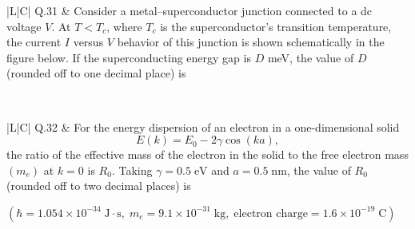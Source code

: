 \documentclass[12pt,a4paper]{article}
\begin{document}
\begin{table}[h!]
\begin{tabular}{|L|C|}
\hline
Q.31 &
Consider a metal--superconductor junction connected to a dc voltage $V$. At $T < T_c$,
where $T_c$ is the superconductor's transition temperature, the current $I$ versus $V$
behavior of this junction is shown schematically in the figure below. If the
superconducting energy gap is $D$ meV, the value of $D$ (rounded off to one decimal
place) is \underline{\hspace{1.5cm}}

\vspace{0.4cm}

\begin{center}
\end{center}
\\
\hline
\end{tabular}
\end{table}

\vspace{0.4cm}

\begin{table}[h!]
\begin{tabular}{|L|C|}
\hline
Q.32 &
For the energy dispersion of an electron in a one-dimensional solid
\[
  E(k) = E_0 - 2\gamma\cos(ka),
\]
the ratio of the effective mass of the electron in the solid to the free electron mass
$(m_e)$ at $k = 0$ is $R_0$. Taking $\gamma = 0.5\;\text{eV}$ and $a = 0.5\;\text{nm}$,
the value of $R_0$ (rounded off to two decimal places) is \underline{\hspace{1.5cm}}

\medskip
$(\hbar = 1.054\times10^{-34}\;\text{J}\cdot\text{s},\;
  m_e = 9.1\times10^{-31}\;\text{kg},\;
  \text{electron charge} = 1.6\times10^{-19}\;\text{C})$ \\
\hline
\end{tabular}
\end{table}
\end{document}

